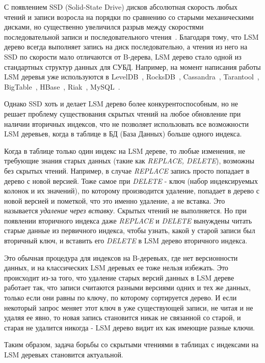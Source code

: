 \documentclass[a4paper,hidelinks,12pt]{article}
\begin{document}
С появлением SSD (Solid-State Drive) дисков абсолютная скорость любых чтений и
записи возросла на порядки по сравнению со старыми механическими дисками, но
существенно увеличился разрыв между скоростями последовательной записи и
последовательного чтения~\cite{ssd-tradeoff}. Благодаря тому, что LSM дерево
всегда выполняет запись на диск последовательно, а чтения из него на SSD по
скорости мало отличаются от B-дерева, LSM дерево стало одной из стандартных
структур данных для СУБД. Например, на момент написания работы LSM деревья уже
используются в LevelDB~\cite{leveldb}, RocksDB~\cite{rocksdb},
Cassandra~\cite{open-chan-ssd}, Tarantool~\cite{tarantool},
BigTable~\cite{open-chan-ssd}, HBase~\cite{open-chan-ssd}, Riak~\cite{riak},
MySQL~\cite{myrocks}.

Однако SSD хоть и делает LSM дерево более конкурентоспособным, но не решает
проблему существования скрытых чтений на любое обновление при наличии вторичных
индексов, что не позволяет использовать все возможности LSM деревьев, когда
в таблице в БД (База Данных) больше одного индекса.

Когда в таблице только один индекс на LSM дереве, то любые изменения, не
требующие знания старых данных (такие как \textit{REPLACE, DELETE}), возможны
без скрытых чтений. Например, в случае \textit{REPLACE} запись просто попадает
в дерево с новой версией. Тоже самое при \textit{DELETE} - ключ (набор
индексируемых колонок и их значений), по которому производится удаление,
попадает в дерево с новой версией и пометкой, что это именно удаление, а не
вставка. Это называется \textit {удаление через вставку}. Скрытых чтений не
выполняется. Но при появлении вторичного индекса даже \textit{REPLACE} и
\textit{DELETE} вынуждены читать старые данные из первичного индекса, чтобы
узнать, какой у старой записи был вторичный ключ, и вставить его \textit{DELETE}
в LSM дерево вторичного индекса.

Это обычная процедура для индексов на B-деревьях, где нет версионности данных, и
на классических LSM деревьях ее тоже нельзя избежать. Это происходит из-за того,
что удаление старых версий данных в LSM дереве работает так, что записи
считаются разными версиями одних и тех же данных, только если они равны по
ключу, по которому сортируется дерево. И если некоторый запрос меняет этот ключ
в уже существующей записи, не читая и не удаляя ее явно, то новая запись
становится никак не связанной со старой, и старая не удалится никогда - LSM
дерево видит их как имеющие разные ключи.

Таким образом, задача борьбы со скрытыми чтениями в таблицах с индексами на LSM
деревьях становится актуальной.
\end{document}
